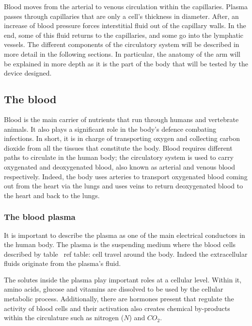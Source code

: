 Blood moves from the arterial to venous circulation within the capillaries. Plasma passes through capillaries that are only a cell's thickness in diameter. After, an increase of blood pressure forces interstitial fluid out of the capillary walls. In the end, some of this fluid returns to the capillaries, and some go into the lymphatic vessels. The different components of the circulatory system will be described in more detail in the following sections. In particular, the anatomy of the arm will be explained in more depth as it is the part of the body that will be tested by the device designed.

\subsection{The blood}
\label{section literature blood}
Blood is the main carrier of nutrients that run through humans and vertebrate animals. It also plays a significant role in the body's defence combating infections. In short, it is in charge of transporting oxygen and collecting carbon dioxide from all the tissues that constitute the body. Blood requires different paths to circulate in the human body; the circulatory system is used to carry oxygenated and deoxygenated blood, also known as arterial and venous blood respectively. Indeed, the body uses arteries to transport oxygenated blood coming out from the heart via the lungs and uses veins to return deoxygenated blood to the heart and back to the lungs.

\subsubsection{The blood plasma}
It is important to describe the plasma as one of the main electrical conductors in the human body. The plasma is the suspending medium where the blood cells described by table \ ref {table: cell} travel around the body. Indeed the extracellular fluids originate from the plasma's fluid.

The solutes inside the plasma play important roles at a cellular level. Within it, amino acids, glucose and vitamins are dissolved to be used by the cellular metabolic process. Additionally, there are hormones present that regulate the activity of blood cells and their activation also creates chemical by-products within the circulature such as nitrogen ($N$) and $CO_2$.

